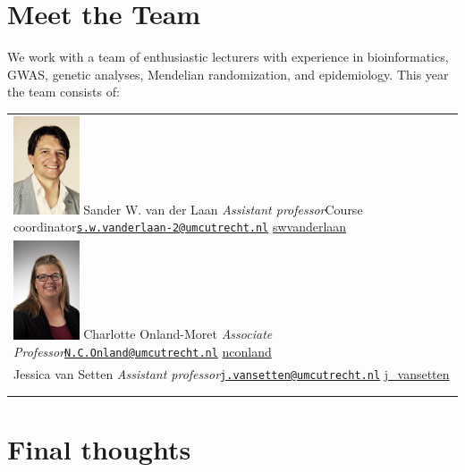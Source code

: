 \documentclass[
]{book}
\begin{document}
\hypertarget{meet-the-team}{%
\section{Meet the Team}\label{meet-the-team}}

We work with a team of enthusiastic lecturers with experience in bioinformatics, GWAS, genetic analyses, Mendelian randomization, and epidemiology. This year the team consists of:

\begin{longtable}[]{@{}
  >{\raggedright\arraybackslash}p{}@{}}
\toprule
\endhead
\includegraphics[width=0.15\textwidth,height=\textheight]{./img/_team/sander_vander_laan.jpg} Sander W. van der Laan \emph{Assistant professor}Course coordinator\href{mailto:s.w.vanderlaan-2@umcutrecht.nl}{\nolinkurl{s.w.vanderlaan-2@umcutrecht.nl}} \textbar{} \href{http://www.twitter.com/swvanderlaan}{swvanderlaan} \\
\includegraphics[width=0.15\textwidth,height=\textheight]{./img/_team/charlotte_onland.jpg} Charlotte Onland-Moret \emph{Associate Professor}\href{mailto:N.C.Onland@umcutrecht.nl}{\nolinkurl{N.C.Onland@umcutrecht.nl}} \textbar{} \href{http://www.twitter.com/nconland}{nconland} \\
\href{./img/_team/jessica_van_setten.jpg}{} Jessica van Setten \emph{Assistant professor}\href{mailto:j.vansetten@umcutrecht.nl}{\nolinkurl{j.vansetten@umcutrecht.nl}} \textbar{} \href{http://www.twitter.com/j_vansetten}{j\_vansetten} \\
 \\
 \\
\bottomrule
\end{longtable}

\hypertarget{final-thoughts}{%
\section{Final thoughts}\label{final-thoughts}}
\end{document}
